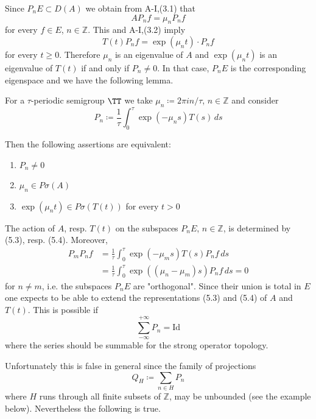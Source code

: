 Since $P_{n}E \subset D(A)$ we obtain from A-I,(3.1) that
\begin{equation}\label{eq:a3-5.3}
	AP_{n}f = \mu_{n}P_{n}f
\end{equation}
for every $f \in E$, $n \in \mathbb{Z}$.
This and A-I,(3.2) imply
\begin{equation}\label{eq:a3-5.4}
	T(t)P_{n}f = \exp(\mu_{n}t) \cdot P_{n}f
\end{equation}
for every $t \geq 0$.
Therefore $\mu_{n}$ is an eigenvalue of $A$ and $\exp(\mu_{n}t)$ is an eigenvalue of $T(t)$ if and only if $P_{n} \neq 0$.
In that case, $P_{n}E$ is the corresponding eigenspace and we have the following lemma.
\begin{lemma}\label{lem:a3-5.3}
	
	For a $\tau$-periodic semigroup $\TT$ we take $\mu_{n} \coloneqq 2\pi in/\tau$, $n \in \mathbb{Z}$ and consider
	\[
	P_{n} \coloneqq \frac{1}{\tau}\int_{0}^{\tau} \exp(-\mu_{n}s)T(s) \, ds
	\]
	
	Then the following assertions are equivalent:
	\begin{enumerate}[a]
		\item $P_{n} \neq 0$
		
		\item $\mu_{n} \in P\sigma(A)$
		
		\item $\exp(\mu_{n}t) \in P\sigma(T(t))$ for every $t > 0$
	\end{enumerate}
\end{lemma}

The action of $A$, resp. $T(t)$ on the subspaces $P_{n}E$, $n \in \mathbb{Z}$, is determined by (5.3), resp. (5.4).
Moreover,
\begin{align*}
	P_{m}P_{n}f &=  \frac{1}{\tau}\int_{0}^{\tau} \exp(-\mu_{m}s)T(s)P_{n}f \, ds \\
	&=  \frac{1}{\tau}\int_{0}^{\tau} \exp((\mu_{n}-\mu_{m})s)P_{n}f \, ds = 0
\end{align*}
for $n \neq m$, i.e. the subspaces $P_{n}E$ are "orthogonal".
Since their union is total in $E$ one expects to be able to extend the representations (5.3) and (5.4) of $A$ and $T(t)$.
This is possible if
\[
\sum_{-\infty}^{+\infty} P_{n} = \text{Id}
\]
where the series should be summable for the strong operator topology.

Unfortunately this is false in general since the family of projections
\[
Q_{H} \coloneqq \sum_{n \in H} P_{n}
\]
where $H$ runs through all finite subsets of $\mathbb{Z}$, may be unbounded (see the example below).
Nevertheless the following is true.


